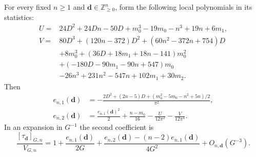 \begin{prp}\label{prp:a:profiles}
For every fixed $n\geq1$ and $\mathbf d\in\mathbb Z_{\geq0}^n$,
form the following local polynomials in its statistics:
\begin{align*}
 U={}&24D^2+24Dn-50D+m_0^3-19m_0-n^3+19n+6m_1,\\
 V={}&80D^3+(120n-372)D^2+(60n^2-372n+754)D\\
 &+8m_0^3+(36D+18m_1+18n-141)m_0^2\\
 &+(-180D-90m_1-90n+547)m_0\\
 &-26n^3+231n^2-547n+102m_1+30m_2.
\end{align*}
Then
\begin{align}
 e_{n,1}(\mathbf d)
 &=-\frac{2D^2+(2n-5)D+(m_0^2-5m_0-n^2+5n)/2}{\pi^2},
 \label{eq:a:first-profile}\\
 e_{n,2}(\mathbf d)
 &=\frac{e_{n,1}(\mathbf d)^2}{2}+\frac{n-m_0}{16}
                  -\frac{U}{12\pi^2}-\frac{V}{12\pi^4}.
 \label{eq:a:second-profile}
\end{align}
In an expansion in $G^{-1}$ the second coefficient is
\begin{equation}\label{eq:a:profile-genus-conversion}
 \frac{[\tau_{\mathbf d}]_{G,n}}{V_{G,n}}
 =1+\frac{e_{n,1}(\mathbf d)}{2G}
 +\frac{e_{n,2}(\mathbf d)-(n-2)e_{n,1}(\mathbf d)}{4G^2}
 +O_{n,\mathbf d}(G^{-3}).
\end{equation}
\end{prp}
